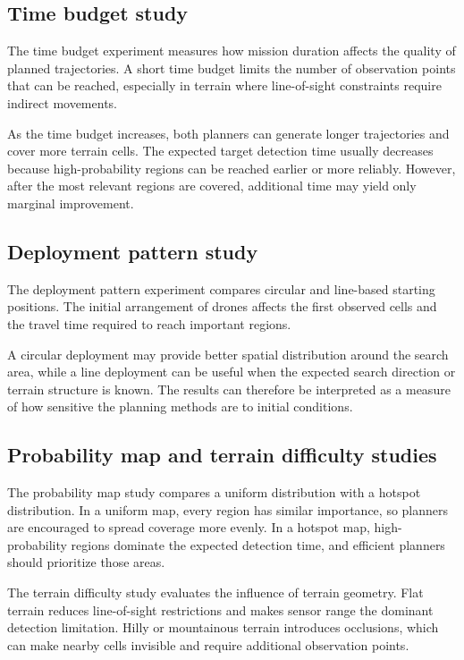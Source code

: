 \documentclass[english]{projectreport}
\begin{document}
\subsection{Time budget study}

The time budget experiment measures how mission duration affects the quality of
planned trajectories. A short time budget limits the number of observation
points that can be reached, especially in terrain where line-of-sight
constraints require indirect movements.

As the time budget increases, both planners can generate longer trajectories and
cover more terrain cells. The expected target detection time usually decreases
because high-probability regions can be reached earlier or more reliably.
However, after the most relevant regions are covered, additional time may yield
only marginal improvement.

\subsection{Deployment pattern study}

The deployment pattern experiment compares circular and line-based starting
positions. The initial arrangement of drones affects the first observed cells
and the travel time required to reach important regions.

A circular deployment may provide better spatial distribution around the search
area, while a line deployment can be useful when the expected search direction
or terrain structure is known. The results can therefore be interpreted as a
measure of how sensitive the planning methods are to initial conditions.

\subsection{Probability map and terrain difficulty studies}

The probability map study compares a uniform distribution with a hotspot
distribution. In a uniform map, every region has similar importance, so planners
are encouraged to spread coverage more evenly. In a hotspot map, high-probability
regions dominate the expected detection time, and efficient planners should
prioritize those areas.

The terrain difficulty study evaluates the influence of terrain geometry. Flat
terrain reduces line-of-sight restrictions and makes sensor range the dominant
detection limitation. Hilly or mountainous terrain introduces occlusions, which
can make nearby cells invisible and require additional observation points.
\end{document}
